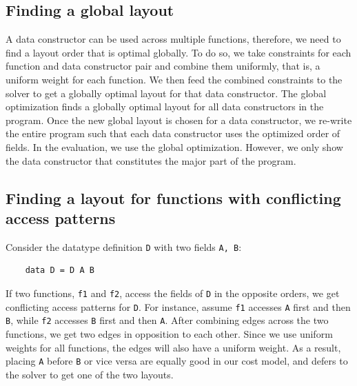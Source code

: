
\subsection{Finding a global layout}
\label{design:global}

A data constructor can be used across multiple functions, therefore, we need to find a layout order that is optimal globally.
To do so, we take constraints for each function and data constructor pair and combine them uniformly, that is, a uniform weight for each function.
We then feed the combined constraints to the solver to get a globally optimal layout for that data constructor. The global optimization finds a globally optimal layout for all data constructors in the program. Once the new global layout is chosen for a data constructor, we re-write the 
entire program such that each data constructor uses the optimized order of fields.
In the evaluation, we use the global optimization. However, we only show the data constructor that constitutes the major part of the program.

\subsection{Finding a layout for functions with conflicting access patterns}
\label{design:conflicting-access-patterns}
Consider the datatype definition \lstinline|D| with two fields \lstinline|A, B|:
\begin{lstlisting}
    data D = D A B
\end{lstlisting}
If two functions, \lstinline|f1| and \lstinline|f2|, access the fields of \lstinline|D| in the opposite orders,
we get conflicting access patterns for \lstinline|D|.
For instance, assume \lstinline|f1| accesses \lstinline|A| first and then \lstinline|B|, while \lstinline|f2|
accesses \lstinline|B| first and then \lstinline|A|. After combining edges across the two functions, we get two edges
in opposition to each other. Since we use uniform weights for all functions, the edges will also have a uniform weight.
As a result,
placing \lstinline|A| before \lstinline|B| or vice versa are equally good in our
cost model, and \system defers to the solver to get one of the two layouts.

